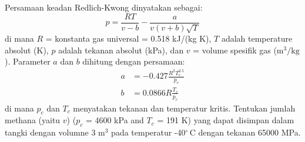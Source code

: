 \begin{soal}
Persamaan keadan Redlich-Kwong dinyatakan sebagai:
\begin{equation*}
p = \frac{RT}{v - b} - \frac{a}{v(v + b)\sqrt{T}}
\end{equation*}
di mana $R$ = konstanta gas universal = 0.518 kJ/(kg K),
$T$ adalah temperature absolut (K), $p$ adalah tekanan absolut (kPa),
dan $v$ = volume spesifik gas ($\mathrm{m}^3/\mathrm{kg}$).
Parameter $a$ dan $b$ dihitung dengan persamaan:
\begin{align*}
a & = -0.427 \frac{R^{2} T_{c}^{2.5}}{p_{c}} \\
b & = 0.0866 R\frac{T_c}{p_c}
\end{align*}
di mana $p_c$ dan $T_c$ menyatakan tekanan dan temperatur kritis.
Tentukan jumlah methana (yaitu $v$) ($p_c$ = 4600 kPa and $T_c$ = 191 K)
yang dapat disimpan dalam tangki dengan volumne 3 $\mathrm{m}^{3}$
pada temperatur -40$^{\circ}\,\mathrm{C}$ dengan tekanan 65000 MPa.
\end{soal}
